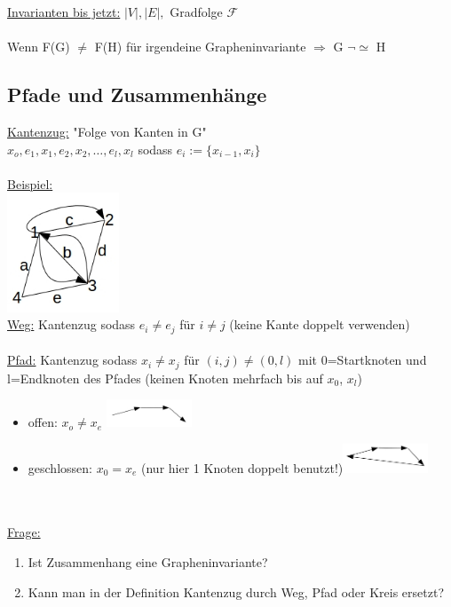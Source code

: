 \underline{Invarianten bis jetzt:} $|V|, |E|,$ Gradfolge $\mathcal{F}$\\\\
Wenn F(G) $\neq$ F(H) für irgendeine Grapheninvariante $\Rightarrow$ G $\neg \simeq$ H

\subsection{Pfade und Zusammenhänge}

\underline{Kantenzug:} "Folge von Kanten in G"\\
$x_o,e_1,x_1,e_2,x_2,…,e_l,x_l$ sodass $e_i:=\{x_{i-1},x_i\}$\\\\
\underline{Beispiel:}\\
\includegraphics[width=0.25\textwidth]{lectures/161014/pix/10.jpg}\\
\underline{Weg:} Kantenzug sodass $e_i \neq e_j$ für $i \neq j$ (keine Kante doppelt verwenden)\\\\
\underline{Pfad:} Kantenzug sodass $x_i \neq x_j$ für $(i,j) \neq (0,l)$ mit 0=Startknoten und l=Endknoten des Pfades (keinen Knoten mehrfach bis auf $x_0$, $x_l$)

\begin{itemize}
	\item offen: $x_o \neq x_e$ \includegraphics[width=0.2\textwidth]{lectures/161014/pix/11.jpg}\\
	\item geschlossen: $x_0=x_e$ (nur hier 1 Knoten doppelt benutzt!)\includegraphics[width=0.2\textwidth]{lectures/161014/pix/12.jpg}
\end{itemize}

\\\\
\underline{Frage:}
\begin{enumerate}
	\item Ist Zusammenhang eine Grapheninvariante?
	\item Kann man in der Definition Kantenzug durch Weg, Pfad oder Kreis ersetzt?
\end{enumerate}